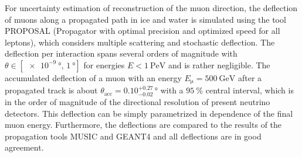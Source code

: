 For uncertainty estimation of reconstruction of the muon direction, the 
deflection of muons along a propagated path in ice and water is simulated using 
the tool PROPOSAL (Propagator with optimal precision and optimized speed for all leptons), which considers multiple scattering and stochastic deflection. 
The deflection per interaction spans several 
orders of magnitude with $\theta \in [\SI[print-unity-mantissa = false]{e-9}{\degree},\, \SI{1}{\degree}]$ 
for energies $E < \SI{1}{\peta\electronvolt}$ 
and is rather negligible. The accumulated 
deflection of a muon with an energy $E_{\mathrm{\mu}} = \SI{500}{\giga\electronvolt}$ 
after a propagated track is about $\theta_{\text{acc}} = 0.10_{-0.02}^{+0.27}\,\si{\degree}$ 
with a $\SI{95}{\percent}$ central interval, which is in the order of magnitude of 
the directional resolution of 
present neutrino detectors. This deflection can be simply parametrized in 
dependence of the final muon energy. Furthermore, the deflections are compared to the results 
of the propagation tools MUSIC and GEANT4 and all deflections are in good 
agreement. 


